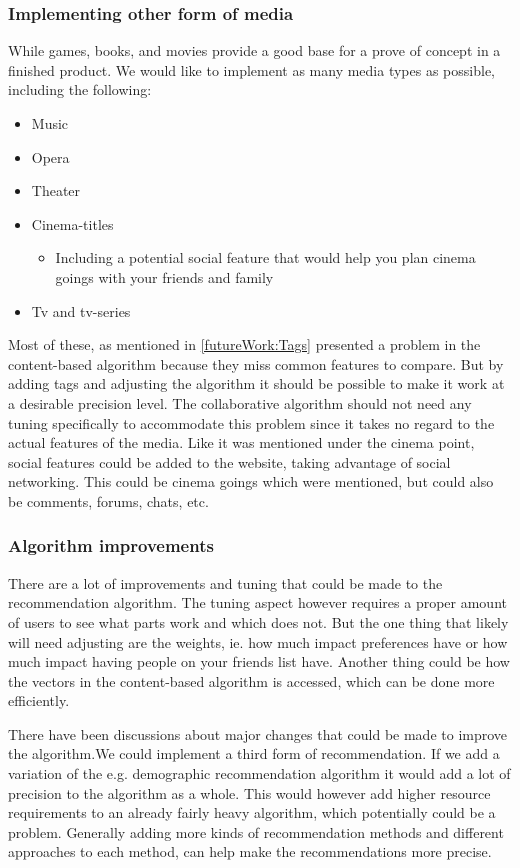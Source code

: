 \subsubsection{Implementing other form of media}
While games, books, and movies provide a good base for a prove of concept in a finished product. We would like to implement as many media types as possible, including the following:
\begin{itemize}
\item Music
\item Opera
\item Theater
\item Cinema-titles
\begin{itemize}
\item Including a potential social feature that would help you plan cinema goings with your friends and family
\end{itemize}
\item Tv and tv-series
\end{itemize}
Most of these, as mentioned in \ref{futureWork:Tags} presented a problem in the content-based algorithm because they miss common features to compare. But by adding tags and adjusting the algorithm it should be possible to make it work at a desirable precision level. The collaborative algorithm should not need any tuning specifically to accommodate this problem since it takes no regard to the actual features of the media. Like it was mentioned under the cinema point, social features could be added to the website, taking advantage of social networking. This could be cinema goings which were mentioned, but could also be comments, forums, chats, etc.

\subsubsection{Algorithm improvements}
There are a lot of improvements and tuning that could be made to the recommendation algorithm. The tuning aspect however requires a proper amount of users to see what parts work and which does not. But the one thing that likely will need adjusting are the weights, ie. how much impact preferences have or how much impact having people on your friends list have. Another thing could be how the vectors in the content-based algorithm is accessed, which can be done more efficiently.

There have been discussions about major changes that could be made to improve the algorithm.We could implement a third form of recommendation. If we add a variation of the e.g. demographic recommendation algorithm it would add a lot of precision to the algorithm as a whole. This would however add higher resource requirements to an already fairly heavy algorithm, which potentially could be a problem. Generally adding more kinds of recommendation methods and different approaches to each method, can help make the recommendations more precise.

